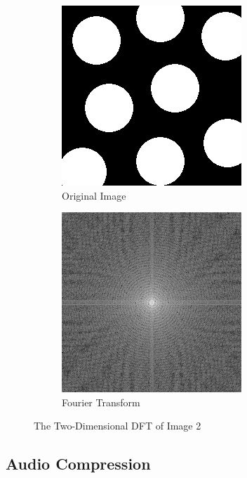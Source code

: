 \documentclass{amsproc}
\begin{document}
\begin{figure}[h]
\centering
\begin{subfigure}{.4\textwidth}
	\centering
	\includegraphics[scale=.55]{images/circles.png}
	\caption{Original Image}
	\label{fig:sub11}
\end{subfigure} \hspace{15mm}
\begin{subfigure}{.4\textwidth}
	\centering
	\includegraphics[scale=.6]{images/2ddft2.png}
	\caption{Fourier Transform}
	\label{fig:sub12}
\end{subfigure}
\caption{The Two-Dimensional DFT of Image 2}
\label{fig:im3}
\end{figure}

\subsection{Audio Compression}
\end{document}
